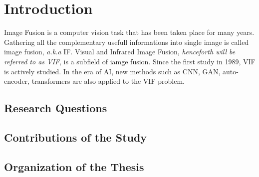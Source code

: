 \chapter{Introduction}
\label{chp:b1}

Image Fusion is a computer vision task that has been taken place for many years. Gathering all the complementary usefull informations into single image is called image fusion, \emph{a.k.a} IF. Visual and Infrared Image Fusion, \emph{henceforth will be referred to as VIF}, is a subfield of iamge fusion. Since the first study \cite{toet1989merging} in 1989, VIF is actively studied. In the era of AI, new methods such as CNN, GAN, auto-encoder, transformers are also applied to the VIF problem.

\section{Research Questions}


\section{Contributions of the Study}

\section{Organization of the Thesis}

